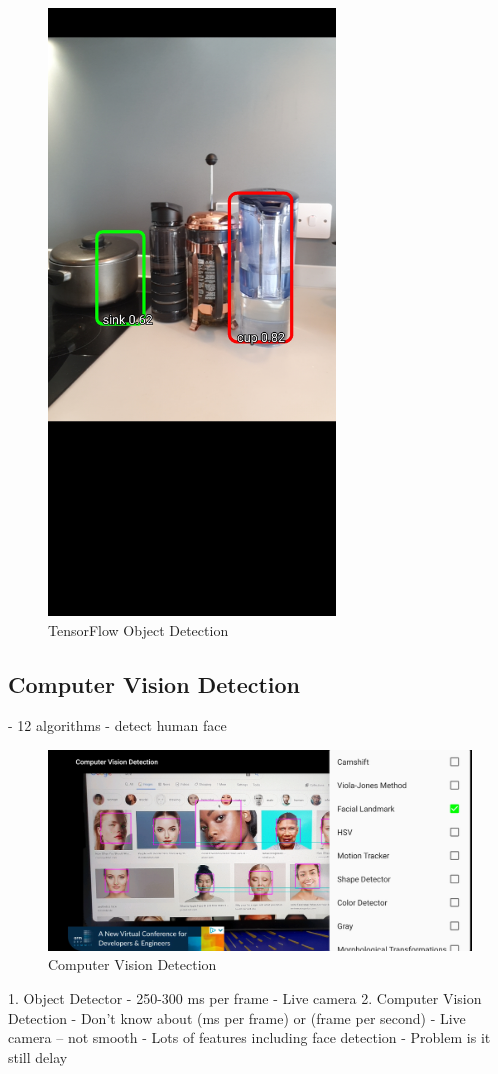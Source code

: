            \begin{figure}[!ht]
                \centering
                \includegraphics[width=3in]{images/chapter2/ml-detection-tf.jpg}
                \caption{TensorFlow Object Detection}
                \label{ts-obj-detection}
            \end{figure}

        \subsection{Computer Vision Detection}
            - 12 algorithms
                - detect human face
            \begin{figure}[!ht]
                \centering
                \includegraphics[width=5in]{images/chapter2/cv-detection.jpg}
                \caption{Computer Vision Detection}
                \label{cv-detection}
            \end{figure}

        1.	Object Detector
            -	250-300 ms per frame
            -	Live camera
        2.	Computer Vision Detection
            -	Don’t know about (ms per frame) or (frame per second)
            -	Live camera – not smooth
            -	Lots of features including face detection
            -	Problem is it still delay
